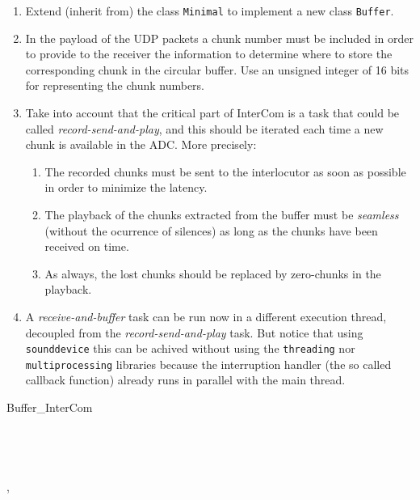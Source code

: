 \begin{enumerate}
\item Extend (inherit from) the class \texttt{Minimal} to implement a
  new class \texttt{Buffer}.
\item In the payload of the UDP packets a chunk number must be
  included in order to provide to the receiver the information to
  determine where to store the corresponding chunk in the circular
  buffer. Use an unsigned integer of 16 bits for representing the
  chunk numbers.
\item Take into account that the critical part of InterCom is a task
  that could be called \emph{record-send-and-play}, and this should be
  iterated each time a new chunk is available in the ADC. More
  precisely:
  \begin{enumerate}
  \item The recorded chunks must be sent to the interlocutor as soon
    as possible in order to minimize the latency.
  \item The playback of the chunks extracted from the buffer must be
    \emph{seamless} (without the ocurrence of silences) as long as the
    chunks have been received on time.
  \item As always, the lost chunks should be replaced by zero-chunks
    in the playback.
  \end{enumerate}
\item A \emph{receive-and-buffer} task can be run now in a different
  execution thread, decoupled from the \emph{record-send-and-play}
  task. But notice that using \texttt{sounddevice} this can be achived
  without using the \texttt{threading} nor \texttt{multiprocessing}
  libraries because the interruption handler (the so called callback
  function) already runs in parallel with the main thread.
\end{enumerate}

\begin{pseudocode}{Buffer\_InterCom}{~}
  \BEGIN
     \GETS {}\\
     \GETS {}\\
    \\
     \GETS {}\\
  \END
  \ENDPROCEDURE
  \BEGIN
     \GETS {}\\
    ,  \GETS {}\\
  \END
  \ENDPROCEDURE
\end{pseudocode}


